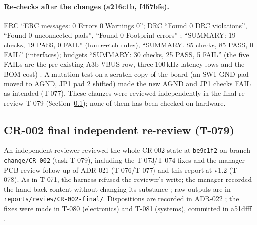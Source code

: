 \paragraph{Re-checks after the changes (a216c1b, f457bfe).} ERC ``ERC messages: 0
Errors 0 Warnings 0''; DRC ``Found 0 DRC violations'', ``Found 0 unconnected
pads'', ``Found 0 Footprint errors'' ;
``SUMMARY: 19 checks, 19 PASS, 0 FAIL'' (home-etch rules); ``SUMMARY: 85 checks, 85
PASS, 0 FAIL'' (interfaces); budgets ``SUMMARY: 30 checks, 25 PASS, 5 FAIL'' (the
five FAILs are the pre-existing A3b VBUS row, three 100\,kHz latency rows and the
BOM cost) . A mutation test on a scratch copy of the board (an SW1
GND pad moved to AGND, JP1 pad 2 shifted) made the new AGND and JP1 checks FAIL as
intended (T-077). These changes were reviewed independently in the final re-review
T-079 (Section~\ref{sec:final-review}); none of them has been checked on hardware.

\subsection{CR-002 final independent re-review (T-079)}
\label{sec:final-review}
An independent reviewer reviewed the whole CR-002 state at \texttt{be9d1f2} on
branch \texttt{change/CR-002} (task T-079), including the T-073/T-074 fixes and the
manager PCB review follow-up of ADR-021 (T-076/T-077) and this report at v1.2
(T-078). As in T-071, the harness refused the reviewer's write; the manager recorded
the hand-back content without changing its substance
; raw outputs are in
\nolinkurl{reports/review/CR-002-final/}. Dispositions are recorded in ADR-022
; the fixes were made in T-080 (electronics) and T-081
(systems), committed in a51dfff
.

